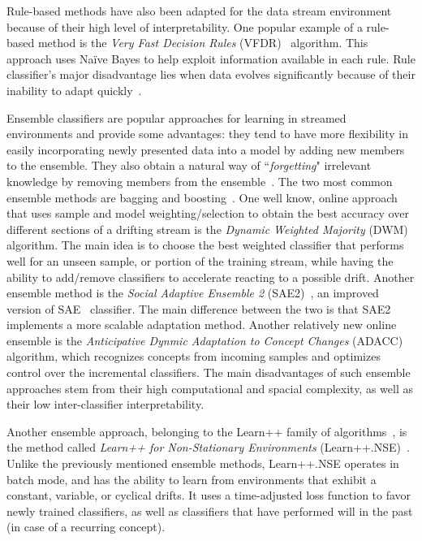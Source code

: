 \documentclass[reqno]{vcuthesis}
\numberwithin{equation}{chapter}
\begin{document}
Rule-based methods have also been adapted for the data stream environment because of their high level of interpretability. One popular example of a rule-based method is the \textit{Very Fast Decision Rules} (VFDR)~\cite{gama2011learning} algorithm. This approach uses Na\"{i}ve Bayes to help exploit information available in each rule. Rule classifier's major disadvantage lies when data evolves significantly because of their inability to adapt quickly~\cite{ditzler2015learning}. 


Ensemble classifiers are popular approaches for learning in streamed environments and provide some advantages: they tend to have more flexibility in easily incorporating newly presented data into a model by adding new members to the ensemble. They also obtain a natural way of ``\textit{forgetting}" irrelevant knowledge by removing members from the ensemble~\cite{ditzler2015learning}. The two most common ensemble methods are bagging and boosting~\cite{oza2001onlinebb}. One well know, online approach that uses sample and model weighting/selection to obtain the best accuracy over different sections of a drifting stream is the \textit{Dynamic Weighted Majority} (DWM)~\cite{kolter2007dynamic} algorithm. The main idea is to choose the best weighted classifier that performs well for an unseen sample, or portion of the training stream, while having the ability to add/remove classifiers to accelerate reacting to a possible drift. Another ensemble method is the \textit{Social Adaptive Ensemble 2} (SAE2)~\cite{gomes2014sae2}, an improved version of SAE~\cite{gomes2013sae} classifier. The main difference between the two is that SAE2 implements a more scalable adaptation method. Another relatively new online ensemble is the \textit{Anticipative Dynmic Adaptation to Concept Changes} (ADACC)~\cite{jaber2013new} algorithm, which recognizes concepts from incoming samples and optimizes control over the incremental classifiers. The main disadvantages of such ensemble approaches stem from their high computational and spacial complexity, as well as their low inter-classifier interpretability.

Another ensemble approach, belonging to the Learn++ family of algorithms~\cite{polikar2001learn}, is the method called \textit{Learn++ for Non-Stationary Environments} (Learn++.NSE)~\cite{elwell2011incremental}. Unlike the previously mentioned ensemble methods, Learn++.NSE operates in batch mode, and has the ability to learn from environments that exhibit a constant, variable, or cyclical drifts. It uses a time-adjusted loss function to favor newly trained classifiers, as well as classifiers that have performed will in the past (in case of a recurring concept). 
\end{document}
